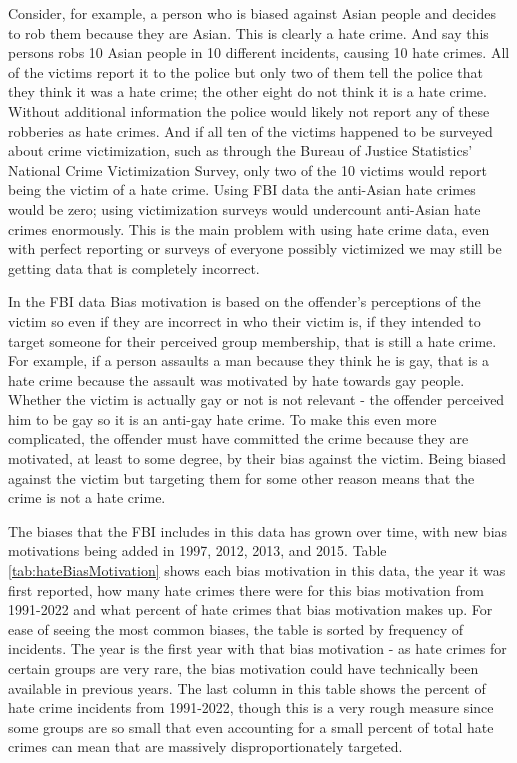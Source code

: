 \documentclass[
]{krantz}
\begin{document}
Consider, for example, a person who is biased against Asian
people and decides to rob them because they are Asian. This
is clearly a hate crime. And say this persons robs 10 Asian
people in 10 different incidents, causing 10 hate crimes.
All of the victims report it to the police but only two of
them tell the police that they think it was a hate crime;
the other eight do not think it is a hate crime. Without
additional information the police would likely not report
any of these robberies as hate crimes. And if all ten of the
victims happened to be surveyed about crime victimization,
such as through the Bureau of Justice Statistics' National
Crime Victimization Survey, only two of the 10 victims would
report being the victim of a hate crime. Using FBI data the
anti-Asian hate crimes would be zero; using victimization
surveys would undercount anti-Asian hate crimes enormously.
This is the main problem with using hate crime data, even
with perfect reporting or surveys of everyone possibly
victimized we may still be getting data that is completely
incorrect.

In the FBI data Bias motivation is based on the offender's
perceptions of the victim so even if they are incorrect in
who their victim is, if they intended to target someone for
their perceived group membership, that is still a hate
crime. For example, if a person assaults a man because they
think he is gay, that is a hate crime because the assault
was motivated by hate towards gay people. Whether the victim
is actually gay or not is not relevant - the offender
perceived him to be gay so it is an anti-gay hate crime. To
make this even more complicated, the offender must have
committed the crime because they are motivated, at least to
some degree, by their bias against the victim. Being biased
against the victim but targeting them for some other reason
means that the crime is not a hate crime.

The biases that the FBI includes in this data has grown over
time, with new bias motivations being added in 1997, 2012,
2013, and 2015. Table \ref{tab:hateBiasMotivation} shows
each bias motivation in this data, the year it was first
reported, how many hate crimes there were for this bias
motivation from 1991-2022 and what percent of hate crimes
that bias motivation makes up. For ease of seeing the most
common biases, the table is sorted by frequency of
incidents. The year is the first year with that bias
motivation - as hate crimes for certain groups are very
rare, the bias motivation could have technically been
available in previous years. The last column in this table
shows the percent of hate crime incidents from 1991-2022,
though this is a very rough measure since some groups are so
small that even accounting for a small percent of total hate
crimes can mean that are massively disproportionately
targeted.
\end{document}
